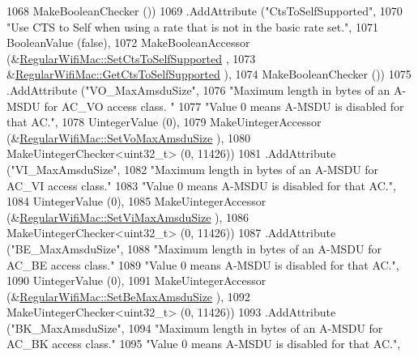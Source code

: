 \begin{DoxyCode}
1068                    MakeBooleanChecker ())
1069     .AddAttribute (\textcolor{stringliteral}{"CtsToSelfSupported"},
1070                    \textcolor{stringliteral}{"Use CTS to Self when using a rate that is not in the basic rate set."},
1071                    BooleanValue (\textcolor{keyword}{false}),
1072                    MakeBooleanAccessor (&\hyperlink{classns3_1_1RegularWifiMac_a0ac262241ccb19ebbdd8bde779eab481}{RegularWifiMac::SetCtsToSelfSupported}
      ,
1073                                         &\hyperlink{classns3_1_1RegularWifiMac_abc0293f087f9ff963f47d318deeb2b49}{RegularWifiMac::GetCtsToSelfSupported}
      ),
1074                    MakeBooleanChecker ())
1075     .AddAttribute (\textcolor{stringliteral}{"VO\_MaxAmsduSize"},
1076                    \textcolor{stringliteral}{"Maximum length in bytes of an A-MSDU for AC\_VO access class. "}
1077                    \textcolor{stringliteral}{"Value 0 means A-MSDU is disabled for that AC."},
1078                    UintegerValue (0),
1079                    MakeUintegerAccessor (&\hyperlink{classns3_1_1RegularWifiMac_a6a64881778387001fcf5bbcbd448e8d3}{RegularWifiMac::SetVoMaxAmsduSize}
      ),
1080                    MakeUintegerChecker<uint32\_t> (0, 11426))
1081     .AddAttribute (\textcolor{stringliteral}{"VI\_MaxAmsduSize"},
1082                    \textcolor{stringliteral}{"Maximum length in bytes of an A-MSDU for AC\_VI access class."}
1083                    \textcolor{stringliteral}{"Value 0 means A-MSDU is disabled for that AC."},
1084                    UintegerValue (0),
1085                    MakeUintegerAccessor (&\hyperlink{classns3_1_1RegularWifiMac_aa172bf782062d45db0fc21b8094e2ff5}{RegularWifiMac::SetViMaxAmsduSize}
      ),
1086                    MakeUintegerChecker<uint32\_t> (0, 11426))
1087     .AddAttribute (\textcolor{stringliteral}{"BE\_MaxAmsduSize"},
1088                    \textcolor{stringliteral}{"Maximum length in bytes of an A-MSDU for AC\_BE access class."}
1089                    \textcolor{stringliteral}{"Value 0 means A-MSDU is disabled for that AC."},
1090                    UintegerValue (0),
1091                    MakeUintegerAccessor (&\hyperlink{classns3_1_1RegularWifiMac_a3447694323cd7a8c77ae2c6748e9b829}{RegularWifiMac::SetBeMaxAmsduSize}
      ),
1092                    MakeUintegerChecker<uint32\_t> (0, 11426))
1093     .AddAttribute (\textcolor{stringliteral}{"BK\_MaxAmsduSize"},
1094                    \textcolor{stringliteral}{"Maximum length in bytes of an A-MSDU for AC\_BK access class."}
1095                    \textcolor{stringliteral}{"Value 0 means A-MSDU is disabled for that AC."},

\end{DoxyCode}
